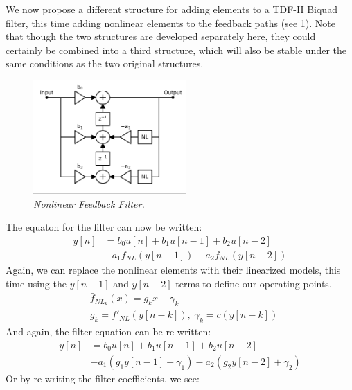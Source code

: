 \documentclass[twoside,a4paper]{article}
\begin{document}
%
We now propose a different structure for adding elements to a TDF-II
Biquad filter, this time adding nonlinear elements to the feedback
paths (see \cref{NL2-TDF-II}). Note that though the two structures are developed
separately here, they could certainly be combined into a third structure,
which will also be stable under the same conditions as the two original
structures.
%
\begin{figure}[ht]
    \center
    \includegraphics[width=2.3in]{../../NonlinearFeedback/Pics/NL2-TDF-II-White.png}
    \caption{\label{NL2-TDF-II}{\it Nonlinear Feedback Filter.}}
\end{figure}
%
The equaton for the filter can now be written:
%
\begin{equation}
    \begin{split}
        y[n] &= b_0 u[n] + b_1 u[n-1] + b_2 u[n-2] \\
             &- a_1 f_{NL}(y[n-1]) - a_2 f_{NL}(y[n-2])
    \end{split}
        \label{eq:nlbq2}
\end{equation}
%
Again, we can replace the nonlinear elements with their linearized
models, this time using the $y[n-1]$ and $y[n-2]$ terms to define our
operating points.
%
\begin{equation}
    \begin{split}
        & \bar{f}_{NL_k}(x) = g_k x + \gamma_k \\
        & g_k = f'_{NL}(y[n-k]), \; \gamma_k = c(y[n-k])
    \end{split}
        \label{eq:gs2}
\end{equation}
%
And again, the filter equation can be re-written:
%
\begin{equation}
    \begin{split}
        y[n] & = b_0 u[n] + b_1 u[n-1] + b_2 u[n-2] \\
        & - a_1 (g_1 y[n-1] + \gamma_1)
        - a_2 (g_2 y[n-2] + \gamma_2)
    \end{split}
        \label{eq:nlbq2_rewrite}
\end{equation}
%
Or by re-writing the filter coefficients, we see:
\end{document}

